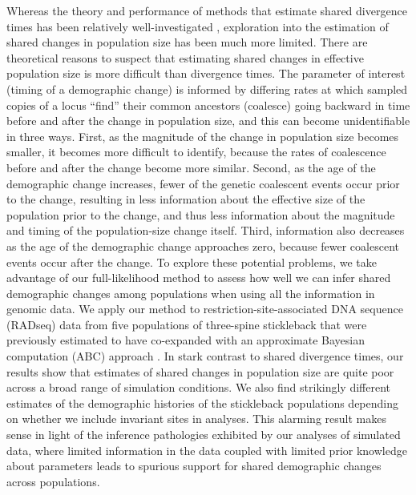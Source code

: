 Whereas the theory and performance of methods that estimate shared divergence
times has been relatively well-investigated
\citep[e.g.,][]{Oaks2012,Hickerson2013,Oaks2014reply,Oaks2014dpp,Overcast2017,Oaks2018ecoevolity},
exploration into the estimation of shared changes in population size has been
much more limited.
There are theoretical reasons to suspect that estimating shared changes in
effective population size is more difficult than divergence times.
The parameter of interest (timing of a demographic change) is informed by
differing rates at which sampled copies of a locus ``find'' their common
ancestors (coalesce) going backward in time before and after the change in
population size, and this can become unidentifiable in three ways.
First, as the magnitude of the change in population size becomes smaller, it
becomes more difficult to identify, because the rates of coalescence before and
after the change become more similar.
Second, as the age of the demographic change increases, fewer of the genetic
coalescent events occur prior to the change, resulting in less information
about the effective size of the population prior to the change, and thus less
information about the magnitude and timing of the population-size change
itself.
Third, information also decreases as the age of the demographic change
approaches zero, because fewer coalescent events occur after the change.
To explore these potential problems, we take advantage of our full-likelihood
method to assess how well we can infer shared demographic changes among
populations when using all the information in genomic data.
We apply our method to restriction-site-associated DNA sequence (RADseq) data
from five populations of three-spine stickleback
\citep[;][]{Hohenlohe2010}
that were previously estimated to have co-expanded with an approximate Bayesian
computation (ABC) approach \citep{Xue2015}.
In stark contrast to shared divergence times, our results show that estimates
of shared changes in population size are quite poor across a broad range of 
simulation conditions.
We also find strikingly different estimates of the demographic histories of the
stickleback populations depending on whether we include invariant sites in
analyses.
This alarming result makes sense in light of the inference pathologies
exhibited by our analyses of simulated data,
where limited information in the data coupled with limited prior knowledge
about parameters leads to spurious support for shared demographic changes
across populations.

\ifembed{

}{}

